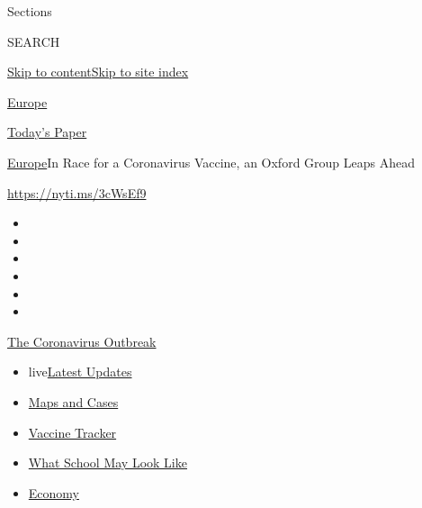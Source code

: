 Sections

SEARCH

\protect\hyperlink{site-content}{Skip to
content}\protect\hyperlink{site-index}{Skip to site index}

\href{https://www.nytimes.com/section/world/europe}{Europe}

\href{https://myaccount.nytimes.com/auth/login?response_type=cookie\&client_id=vi}{}

\href{https://www.nytimes.com/section/todayspaper}{Today's Paper}

\href{/section/world/europe}{Europe}\textbar{}In Race for a Coronavirus
Vaccine, an Oxford Group Leaps Ahead

\url{https://nyti.ms/3cWsEf9}

\begin{itemize}
\item
\item
\item
\item
\item
\item
\end{itemize}

\href{https://www.nytimes.com/news-event/coronavirus?action=click\&pgtype=Article\&state=default\&region=TOP_BANNER\&context=storylines_menu}{The
Coronavirus Outbreak}

\begin{itemize}
\tightlist
\item
  live\href{https://www.nytimes.com/2020/08/02/world/coronavirus-updates.html?action=click\&pgtype=Article\&state=default\&region=TOP_BANNER\&context=storylines_menu}{Latest
  Updates}
\item
  \href{https://www.nytimes.com/interactive/2020/us/coronavirus-us-cases.html?action=click\&pgtype=Article\&state=default\&region=TOP_BANNER\&context=storylines_menu}{Maps
  and Cases}
\item
  \href{https://www.nytimes.com/interactive/2020/science/coronavirus-vaccine-tracker.html?action=click\&pgtype=Article\&state=default\&region=TOP_BANNER\&context=storylines_menu}{Vaccine
  Tracker}
\item
  \href{https://www.nytimes.com/interactive/2020/07/29/us/schools-reopening-coronavirus.html?action=click\&pgtype=Article\&state=default\&region=TOP_BANNER\&context=storylines_menu}{What
  School May Look Like}
\item
  \href{https://www.nytimes.com/live/2020/07/31/business/stock-market-today-coronavirus?action=click\&pgtype=Article\&state=default\&region=TOP_BANNER\&context=storylines_menu}{Economy}
\end{itemize}


